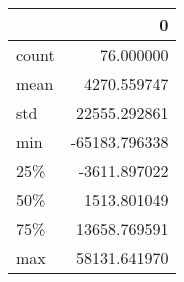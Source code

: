 \begin{tabular}{lr}
\toprule
{} &             0 \\
\midrule
count &     76.000000 \\
mean  &   4270.559747 \\
std   &  22555.292861 \\
min   & -65183.796338 \\
25\%   &  -3611.897022 \\
50\%   &   1513.801049 \\
75\%   &  13658.769591 \\
max   &  58131.641970 \\
\bottomrule
\end{tabular}
